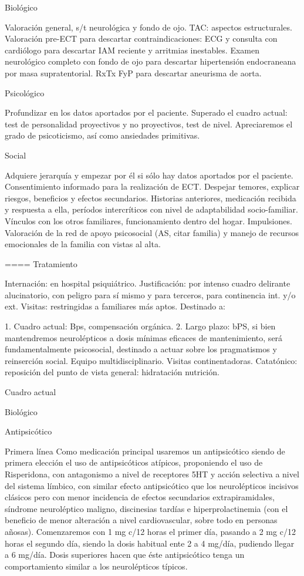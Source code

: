 \documentclass[encares.tex]{subfiles}
\begin{document}
Biológico

Valoración general, s/t neurológica y fondo de ojo. TAC: aspectos estructurales. Valoración pre-ECT para descartar contraindicaciones: ECG y consulta con cardiólogo para descartar IAM reciente y arritmias inestables. Examen neurológico completo con fondo de ojo para descartar hipertensión endocraneana por masa supratentorial. RxTx FyP para descartar aneurisma de aorta.

Psicológico

Profundizar en los datos aportados por el paciente. Superado el cuadro actual: test de personalidad proyectivos y no proyectivos, test de nivel. Apreciaremos el grado de psicoticismo, así como ansiedades primitivas.

Social

Adquiere jerarquía y empezar por él si sólo hay datos aportados por el paciente. Consentimiento informado para la realización de ECT. Despejar temores, explicar riesgos, beneficios y efectos secundarios. Historias anteriores, medicación recibida y respuesta a ella, períodos intercríticos con nivel de adaptabilidad socio-familiar. Vínculos con los otros familiares, funcionamiento dentro del hogar. Impulsiones. Valoración de la red de apoyo psicosocial (AS, citar familia) y manejo de recursos emocionales de la familia con vistas al alta.

==== Tratamiento

Internación: en hospital psiquiátrico. Justificación: por intenso cuadro delirante alucinatorio, con peligro para sí mismo y para terceros, para continencia int. y/o ext. Visitas: restringidas a familiares más aptos. Destinado a:

1. Cuadro actual: Bps, compensación orgánica. 2. Largo plazo: bPS, si bien mantendremos neurolépticos a dosis mínimas eficaces de mantenimiento, será fundamentalmente psicosocial, destinado a actuar sobre los pragmatismos y reinserción social. Equipo multidisciplinario. Visitas continentadoras. Catatónico: reposición del punto de vista general: hidratación nutrición.

Cuadro actual

Biológico

Antipsicótico

Primera línea Como medicación principal usaremos un antipsicótico siendo de primera elección el uso de antipsicóticos atípicos, proponiendo el uso de Risperidona, con antagonismo a nivel de receptores 5HT y acción selectiva a nivel del sistema límbico, con similar efecto antipsicótico que los neurolépticos incisivos clásicos pero con menor incidencia de efectos secundarios extrapiramidales, síndrome neuroléptico maligno, discinesias tardías e hiperprolactinemia (con el beneficio de menor alteración a nivel cardiovascular, sobre todo en personas añosas). Comenzaremos con 1 mg c/12 horas el primer día, pasando a 2 mg c/12 horas el segundo día, siendo la dosis habitual ente 2 a 4 mg/día, pudiendo llegar a 6 mg/día. Dosis superiores hacen que éste antipsicótico tenga un comportamiento similar a los neurolépticos típicos.
\end{document}

